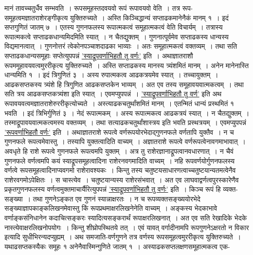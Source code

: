 \documentclass[11pt, openany]{book}
\begin{document}
\begin{sloppypar}
\noindent मानं तावच्चतुर्धैव सम्भवति~। रूपसमूहस्तदवयवो रूपं रूपावयवो वेति~। तत्र रूप-समूहत्वमज्ञातराशेरङ्गीकृत्य युक्तिरुच्यते~। अस्ति किञ्चिद्धान्यं सप्ताढकमानेनैकं मानम् १~। इदं सप्तगुणितं जातम् ७~। एतस्य गुणनफलस्य रूपात्मकत्वं समूहात्मकत्वं वेति विचार्यम्~। तत्रास्य रूपात्मकत्वे सप्ताढकधान्यमिदमिति स्यात्~। न चैतद्युक्तम्~। गुणनात्पूर्वमेव सप्ताढकस्य धान्यस्य विद्यमानत्वात्~। गुणनोत्तरं त्वेकोनपञ्चाशदाढका भाव्याः~। अतः समूहात्मकत्वं वक्तव्यम्~। तथा सति सप्ताढकधान्यसमूहाः सप्तेत्युपपन्नं \hyperref[3.26]{'स्याद्रूपवर्णाभिहतौ तु वर्णः'} इति~। अथाज्ञातराशौ रूपममूहावयवत्वमुररीकृत्य युक्तिरुच्यते~। अस्ति सप्ताढकस्य मानस्य त्र्यंशमितं मानम्~। अनेन मानेनास्ति धान्यमिति १~। इदं त्रिगुणितं ३~। अस्य रुपात्मकत्व आढकत्रयमेव स्यात्~। तच्चायुक्तम्~। आढकसप्तकस्य त्र्यंशे हि त्रिगुणित आढकसप्तकेन भाव्यम्~। अत एव तस्य समूहावयवात्मकत्वम्~। तथा सति त्रय आढकसप्तकत्र्यंशा इति स्यात्~। एवमप्युपपन्नं~। \hyperref[3.26]{'स्याद्रूपवर्णाभिहतौ तु वर्ण'} इति अथ रूपावयवत्वमज्ञातराशेरुररीकृत्योच्यते~। अस्त्याढकचतुर्थांशमितं मानम्~। एतन्मितं धान्यं प्रस्थमितं १ भवति~। इदं त्रिभिर्गुणितं ३~। नेदं रूपात्मकम्~। अस्य रूपात्मकत्व आढकत्रयं स्यात्~। न चैतद्युक्तम्~। तस्माद्रूपावयवात्मकत्वमस्य वक्तव्यम्~। तथा सत्याढकचतुर्थांशास्त्रय इति भवति प्रस्थत्रयम्~। एवमप्युपपन्नं \hyperref[3.26]{'रूपवर्णाभिहतौ वर्णः'} इति~। अथाज्ञातराशे रूपत्वे वर्णरूपयोरभेदाद्गुणनफले वर्णतापि युक्तैव~। न च गुणनफले रूपत्वमेवास्तु~। तस्यापि युक्तत्वादिति वाच्यम्~। अज्ञातराशे रूपत्वे वर्णरूपत्वेनावगमाभावात्~। अवधृते हि राशे रूपत्वे गुणनफले रूपत्वमपि युक्तम्~। अत्र तु राशेरज्ञानाद्रूपत्वानवधारणात्~। न चैवं गुणनफले वर्णत्वमपि कयं स्याद्रूपसमूहत्वादिना राशेरनवगमादिति वाच्यम्~। नहि रूपवर्णयोर्गुणनफलस्य वर्णत्वे रूपसमूहत्वादिनाप्यवगमो राशेरावश्यकः~। किन्तु तस्य चतुष्टयसाधारणत्वाच्चतुष्टयान्यतमत्वेनैव राशेरवगमोऽपेक्षितः~। स चास्त्येव~। चतुष्टयान्यस्य राशेरसंभवात्~। अत एव लाघवाद्वर्णत्वपुरस्कारेणैव प्रकृतगुणनफलस्य वर्णत्वमुक्तमाचार्यैरित्युपपन्नं \hyperref[3.26]{'स्याद्रूपवर्णाभिहतौ तु वर्णः'} इति~। किञ्च रूपं हि व्यक्त-सङ्ख्या~। तथा गुणनेऽङ्कत एव गुणनं स्यान्नाक्षरतः~। न च रूपव्यक्तसङ्ख्ययोरभेदे सङ्ख्याज्ञापकाङ्कलिखनमेवास्तु किं रूपप्रथमाक्षरलिखनेनेति वाच्यम्~। अङ्कस्य भेदकाभावे वर्णाङ्कसंनिधानेन कदाचित्सङ्करः स्यादित्यसङ्करार्थं रूपाक्षरलिखनात्~। अत एव सति रेखादिके भेदके नास्त्येवाक्षरलिखनोपयोगः~। किन्तु शीघ्रोपस्थितये तत्~। एवं यावत् वर्गादीनामपि रूपगुणनेऽक्षरतो न विकार इत्यादि सुधीभिरन्यदप्युह्यम्~। अथ समजाति-वर्णगुणने तत्र वर्णस्य रूपसमूहत्वमुररीकृत्य युक्तिरुच्यते~। यथाढसप्तकस्यैकः समूहः १ अनेनैवास्मिन्गुणिते जातम् १~। अस्याढकसप्तलक्षणसमूहात्मकत्व एक-
\end{sloppypar}
\end{document}
